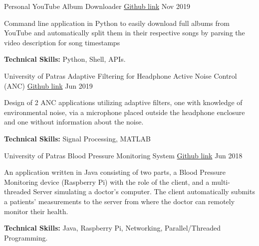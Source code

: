 

\begin{cventries}

  \cventry
    {Personal} %
    {YouTube Album Downloader} %
    {\href{https://github.com/Panagiotis-Zachos/youtube-downloader-autosplit}{Github link}} %
    {Nov 2019} %
    {
      \begin{cvitems} %
        \item {Command line application in Python to easily download full albums from YouTube and automatically split them in their respective songs by parsing the video description for song timestamps}
        \item {\textbf{Technical Skills:} Python, Shell, APIs.}
      \end{cvitems}
    }


  \cventry
    {University of Patras} %
    {Adaptive Filtering for Headphone Active Noise Control (ANC)} %
    {\href{https://github.com/Panagiotis-Zachos/adaptive-filtering-for-ANC}{Github link}} %
    {Jun 2019} %
    {
      \begin{cvitems} %
        \item {Design of 2 ANC applications utilizing adaptive filters, one with knowledge of environmental noise, via a microphone placed outside the headphone enclosure and one without information about the noise.}
        \item {\textbf{Technical Skills:} Signal Processing, MATLAB}
      \end{cvitems}
    }

  \cventry
    {University of Patras} %
    {Blood Pressure Monitoring System} %
    {\href{https://github.com/Panagiotis-Zachos/Blood-Pressure-Monitoring-System}{Github link}} %
    {Jun 2018} %
    {
      \begin{cvitems} %
        \item {An application written in Java consisting of two parts, a Blood Pressure Monitoring device (Raspberry Pi) with the role of the client, and a multi-threaded Server simulating a doctor's computer. The client automatically submits a patients' measurements to the server from where the doctor can remotely monitor their health.}
        \item {\textbf{Technical Skills:} Java, Raspberry Pi, Networking, Parallel/Threaded Programming.}
      \end{cvitems}
    }


\end{cventries}
